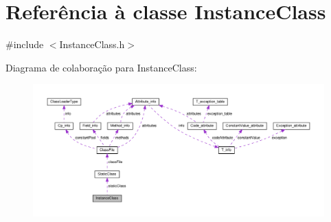 \hypertarget{classInstanceClass}{}\section{Referência à classe Instance\+Class}
\label{classInstanceClass}


{\ttfamily \#include $<$Instance\+Class.\+h$>$}



Diagrama de colaboração para Instance\+Class\+:
\nopagebreak
\begin{figure}[H]
\begin{center}
\leavevmode
\includegraphics[width=350pt]{classInstanceClass__coll__graph}
\end{center}
\end{figure}
